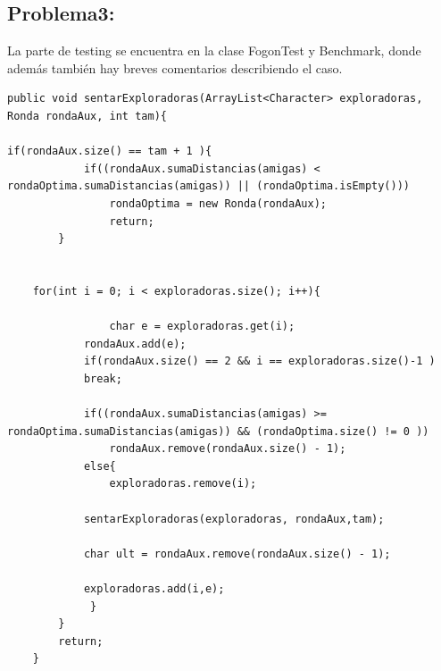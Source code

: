 \documentclass[10pt, a4paper]{article}
\begin{document}
\subsection{Problema3:}
La parte de testing se encuentra en la clase FogonTest y Benchmark, donde además también hay breves comentarios describiendo el caso.
\begin{verbatim}
public void sentarExploradoras(ArrayList<Character> exploradoras, Ronda rondaAux, int tam){

if(rondaAux.size() == tam + 1 ){ 			
		    if((rondaAux.sumaDistancias(amigas) < rondaOptima.sumaDistancias(amigas)) || (rondaOptima.isEmpty()))
				rondaOptima = new Ronda(rondaAux);
				return;
		}	
		

	for(int i = 0; i < exploradoras.size(); i++){

				char e = exploradoras.get(i);
			rondaAux.add(e);
			if(rondaAux.size() == 2 && i == exploradoras.size()-1 )
			break;	
		
			if((rondaAux.sumaDistancias(amigas) >= rondaOptima.sumaDistancias(amigas)) && (rondaOptima.size() != 0 ))
				rondaAux.remove(rondaAux.size() - 1);	
			else{
				exploradoras.remove(i);
			
			sentarExploradoras(exploradoras, rondaAux,tam);
						
			char ult = rondaAux.remove(rondaAux.size() - 1);

			exploradoras.add(i,e);
			 }
		}	
		return;
	}

\end{verbatim}
\end{document}
